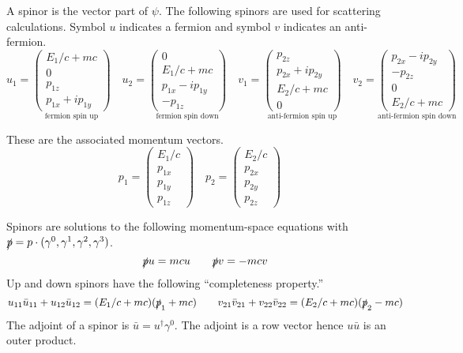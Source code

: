 \documentclass[12pt]{article}
\begin{document}
\noindent
A spinor is the vector part of $\psi$.
The following spinors are used for scattering calculations.
Symbol $u$ indicates a fermion and symbol $v$ indicates an anti-fermion.
\begin{equation*}
u_1=\underset{\text{fermion spin up}}{\begin{pmatrix}E_1/c+mc\\0\\p_{1z}\\p_{1x}+ip_{1y}\end{pmatrix}}
\quad
u_2=\underset{\text{fermion spin down}}{\begin{pmatrix}0\\E_1/c+mc\\p_{1x}-ip_{1y}\\-p_{1z}\end{pmatrix}}
\quad
v_1=\underset{\text{anti-fermion spin up}}{\begin{pmatrix}p_{2z}\\p_{2x}+ip_{2y}\\E_2/c+mc\\0\end{pmatrix}}
\quad
v_2=\underset{\text{anti-fermion spin down}}{\begin{pmatrix}p_{2x}-ip_{2y}\\-p_{2z}\\0\\E_2/c+mc\end{pmatrix}}
\end{equation*}

\noindent
These are the associated momentum vectors.
$$
p_1=\begin{pmatrix}E_1/c\\p_{1x}\\p_{1y}\\p_{1z}\end{pmatrix}\quad
p_2=\begin{pmatrix}E_2/c\\p_{2x}\\p_{2y}\\p_{2z}\end{pmatrix}\quad
$$

\noindent
Spinors are solutions to the following momentum-space equations with
$\slashed{p}=p\cdot(\gamma^0,\gamma^1,\gamma^2,\gamma^3)$.
$$
\slashed{p}u=mcu\qquad\slashed{p}v=-mcv
$$
Up and down spinors have the following ``completeness property.''
$$
u_{11}\bar{u}_{11}+u_{12}\bar{u}_{12}=(E_1/c+mc)(\slashed{p}_1+mc)\qquad
v_{21}\bar{v}_{21}+v_{22}\bar{v}_{22}=(E_2/c+mc)(\slashed{p}_2-mc)
$$
The adjoint of a spinor is $\bar{u}=u^\dag\gamma^0$.
The adjoint is a row vector hence $u\bar{u}$ is an outer product.
\end{document}
